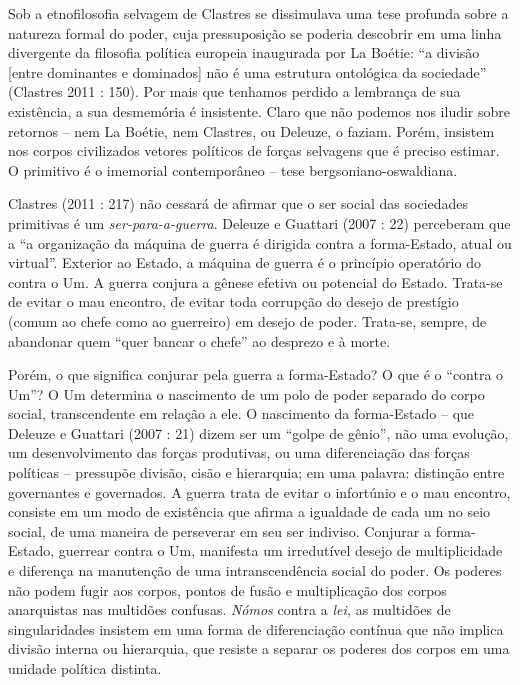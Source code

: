 Sob a etnofilosofia selvagem de Clastres se dissimulava uma tese
profunda sobre a natureza formal do poder, cuja pressuposição se poderia
descobrir em uma linha divergente da filosofia política europeia
inaugurada por La Boétie: ``a divisão {[}entre dominantes e dominados{]}
não é uma estrutura ontológica da sociedade'' (Clastres 2011 : 150). Por
mais que tenhamos perdido a lembrança de sua existência, a sua
desmemória é insistente. Claro que não podemos nos iludir sobre retornos
-- nem La Boétie, nem Clastres, ou Deleuze, o faziam. Porém, insistem
nos corpos civilizados vetores políticos de forças selvagens que é
preciso estimar. O primitivo é o imemorial contemporâneo -- tese
bergsoniano-oswaldiana.

Clastres (2011 : 217) não cessará de afirmar que o ser social das
sociedades primitivas é um \emph{ser-para-a-guerra}. Deleuze e Guattari
(2007 : 22) perceberam que a ``a organização da máquina de guerra é
dirigida contra a forma-Estado, atual ou virtual''. Exterior ao Estado,
a máquina de guerra é o princípio operatório do contra o Um. A guerra
conjura a gênese efetiva ou potencial do Estado. Trata-se de evitar o
mau encontro, de evitar toda corrupção do desejo de prestígio (comum ao
chefe como ao guerreiro) em desejo de poder. Trata-se, sempre, de
abandonar quem ``quer bancar o chefe'' ao desprezo e à morte.

Porém, o que significa conjurar pela guerra a forma-Estado? O que é o
``contra o Um''? O Um determina o nascimento de um polo de poder
separado do corpo social, transcendente em relação a ele. O nascimento
da forma-Estado -- que Deleuze e Guattari (2007 : 21) dizem ser um
``golpe de gênio'', não uma evolução, um desenvolvimento das forças
produtivas, ou uma diferenciação das forças políticas -- pressupõe
divisão, cisão e hierarquia; em uma palavra: distinção entre governantes
e governados. A guerra trata de evitar o infortúnio e o mau encontro,
consiste em um modo de existência que afirma a igualdade de cada um no
seio social, de uma maneira de perseverar em seu ser indiviso. Conjurar
a forma-Estado, guerrear contra o Um, manifesta um irredutível desejo de
multiplicidade e diferença na manutenção de uma intranscendência social
do poder. Os poderes não podem fugir aos corpos, pontos de fusão e
multiplicação dos corpos anarquistas nas multidões confusas. \emph{Nómos
}contra a \emph{lei, }as multidões de singularidades insistem em uma
forma de diferenciação contínua que não implica divisão interna ou
hierarquia, que resiste a separar os poderes dos corpos em uma unidade
política distinta.

